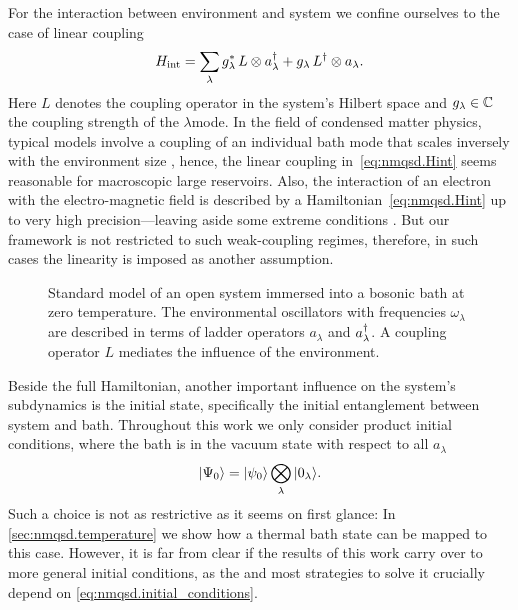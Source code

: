 For the interaction between environment and system we confine ourselves to the case of linear coupling
\begin{equation}
  H_\mathrm{int} = \sum_\lambda {g}^*_\lambda \, L \otimes a^\dagger_\lambda + g_\lambda \, L^\dagger \otimes a_\lambda.
  \label{eq:nmqsd.Hint}
\end{equation}
Here $L$ denotes the coupling operator in the system's Hilbert space and $g_\lambda \in \mathbb{C}$ the coupling strength of the $\lambda$\th mode.
In the field of condensed matter physics, typical models involve a coupling of an individual bath mode that scales inversely with the environment size \cite{We99_dissipative_systems}, hence, the linear coupling in~\ref{eq:nmqsd.Hint} seems reasonable for macroscopic large reservoirs.
Also, the interaction of an electron with the electro-magnetic field is described by a Hamiltonian~\ref{eq:nmqsd.Hint} up to very high precision---leaving aside some extreme conditions \cite{WaMi08_quantum_optics}.
But our framework is not restricted to such weak-coupling regimes, therefore, in such cases the linearity is imposed as another assumption.

\begin{figure}
  \centering
  
  \caption{%
    Standard model of an open system immersed into a bosonic bath at zero temperature.
    The environmental oscillators with frequencies $\omega_\lambda$ are described in terms of ladder operators $a_\lambda$ and $a^\dagger_\lambda$.
    A coupling operator $L$ mediates the influence of the environment.
  }
  \label{fig:nmqsd.open_system}
\end{figure}

Beside the full Hamiltonian, another important influence on the system's subdynamics is the initial state, specifically the initial entanglement between system and bath.
Throughout this work we only consider product initial conditions, where the bath is in the vacuum state with respect to all $a_\lambda$
\begin{equation}
  | \Psi_0 \rangle = | \psi_0 \rangle \bigotimes\limits_\lambda | 0_\lambda \rangle.
  \label{eq:nmqsd.initial_conditions}
\end{equation}
Such a choice is not as restrictive as it seems on first glance: In \autoref{sec:nmqsd.temperature} we show how a thermal bath state can be mapped to this case.
However, it is far from clear if the results of this work carry over to more general initial conditions, as the \NMSSE and most strategies to solve it crucially depend on \autoref{eq:nmqsd.initial_conditions}.\\



